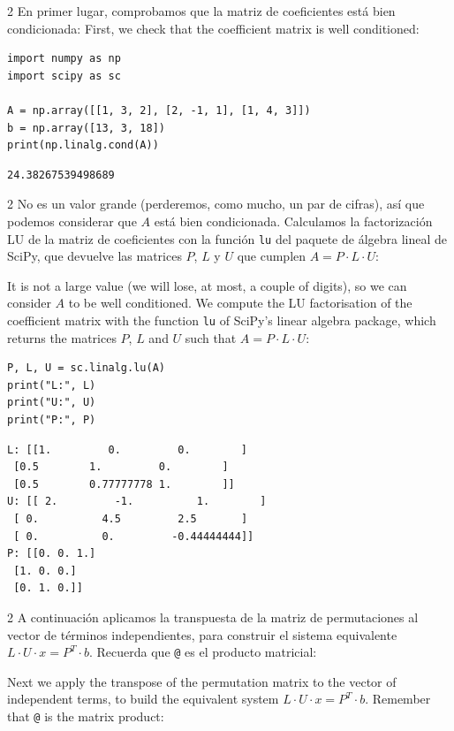 \begin{paracol}{2}
En primer lugar, comprobamos que la matriz de coeficientes está bien condicionada:
\switchcolumn
First, we check that the coefficient matrix is well conditioned:
\end{paracol}

\begin{verbatim}
import numpy as np
import scipy as sc

A = np.array([[1, 3, 2], [2, -1, 1], [1, 4, 3]])
b = np.array([13, 3, 18])
print(np.linalg.cond(A))
\end{verbatim}
\begin{verbatim}
24.38267539498689
\end{verbatim}

\begin{paracol}{2}
No es un valor grande (perderemos, como mucho, un par de cifras), así que podemos considerar que $A$ está bien condicionada. Calculamos la factorización LU de la matriz de coeficientes con la función \texttt{lu} del paquete de álgebra lineal de SciPy, que devuelve las matrices $P$, $L$ y $U$ que cumplen $A=P \cdot L \cdot U$:

\switchcolumn
It is not a large value (we will lose, at most, a couple of digits), so we can consider $A$ to be well conditioned. We compute the LU factorisation of the coefficient matrix with the function \texttt{lu} of SciPy's linear algebra package, which returns the matrices $P$, $L$ and $U$ such that $A=P \cdot L \cdot U$:
\end{paracol}

\begin{verbatim}
P, L, U = sc.linalg.lu(A)
print("L:", L)
print("U:", U)
print("P:", P)
\end{verbatim}
\begin{verbatim}
L: [[1.         0.         0.        ]
 [0.5        1.         0.        ]
 [0.5        0.77777778 1.        ]]
U: [[ 2.         -1.          1.        ]
 [ 0.          4.5         2.5       ]
 [ 0.          0.         -0.44444444]]
P: [[0. 0. 1.]
 [1. 0. 0.]
 [0. 1. 0.]]
\end{verbatim}

\begin{paracol}{2}
A continuación aplicamos la transpuesta de la matriz de permutaciones al vector de términos independientes, para construir el sistema equivalente $L\cdot U \cdot x=P^T\cdot b$. Recuerda que \texttt{@} es el producto matricial:

\switchcolumn
Next we apply the transpose of the permutation matrix to the vector of independent terms, to build the equivalent system $L\cdot U \cdot x= P^T\cdot b$. Remember that \texttt{@} is the matrix product:
\end{paracol}

